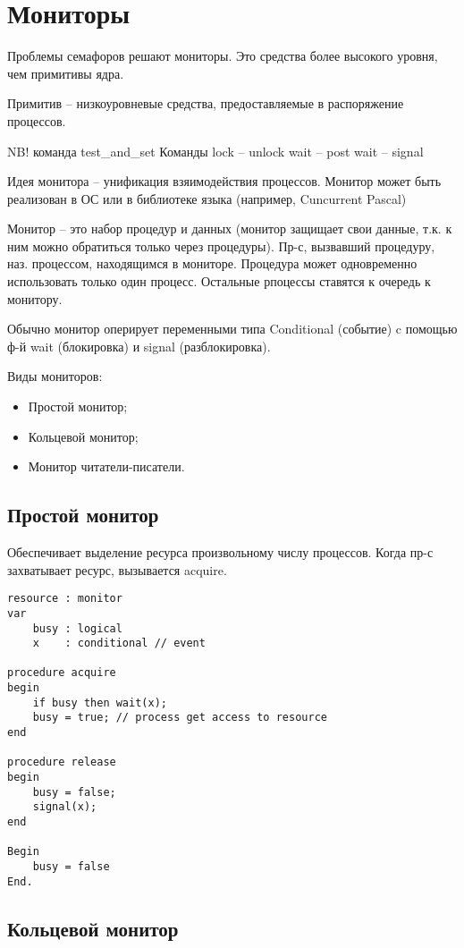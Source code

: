\chapter{Мониторы}
Проблемы семафоров решают мониторы. Это средства более высокого уровня, чем примитивы ядра.

Примитив -- низкоуровневые средства, предоставляемые в распоряжение процессов.

NB! команда test\_and\_set
Команды lock -- unlock
		wait -- post
		wait -- signal
		
Идея монитора -- унификация взяимодействия процессов. Монитор может быть реализован в ОС или в библиотеке языка (например, Cuncurrent Pascal)

Монитор -- это набор процедур и данных (монитор защищает свои данные, т.к. к ним можно обратиться только через процедуры). Пр-с, вызвавший процедуру, наз. процессом, находящимся в мониторе. Процедура может одновременно использовать только один процесс. Остальные рпоцессы ставятся к очередь к монитору.

Обычно монитор оперирует переменными типа Conditional (событие) c помощью ф-й wait (блокировка) и signal (разблокировка).

Виды мониторов:
\begin{itemize}
	\item Простой монитор;
	\item Кольцевой монитор;
	\item Монитор читатели-писатели.
\end{itemize}

\section{Простой монитор}
Обеспечивает выделение ресурса произвольному числу процессов.
Когда пр-с захватывает ресурс, вызывается acquire. 
\begin{lstlisting}[label=lst:SimpleMonitor,caption=Код монитора]
resource : monitor
var
	busy : logical
	x    : conditional // event
	
procedure acquire
begin
	if busy then wait(x);
	busy = true; // process get access to resource
end

procedure release
begin
	busy = false;
	signal(x);
end

Begin
	busy = false
End.
\end{lstlisting}

\section{Кольцевой монитор}

